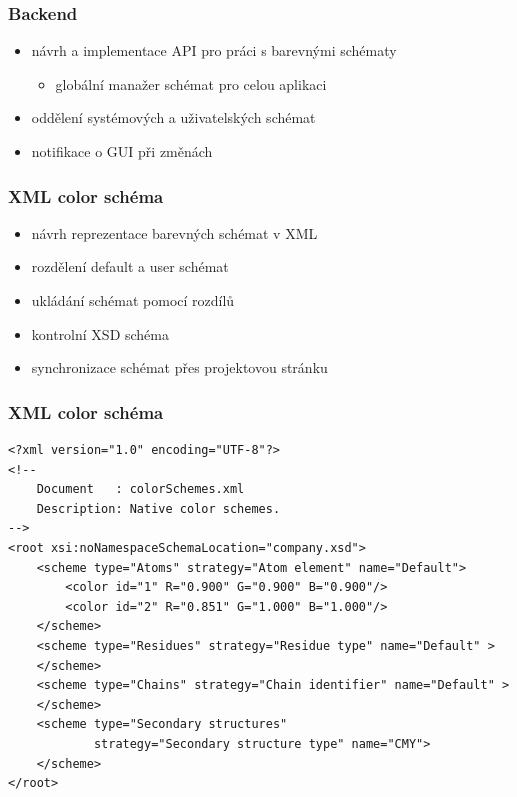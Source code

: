 \documentclass[slovak]{beamer}
\begin{document}
\begin{frame}
\frametitle{Backend}
	\begin{itemize}
		\item návrh a implementace API pro práci s barevnými schématy
		\begin{itemize}
			\item globální manažer schémat pro celou aplikaci
		\end{itemize}
		\item oddělení systémových a uživatelských schémat
		\item notifikace o GUI při změnách
	\end{itemize}
\end{frame}

\begin{frame}
\frametitle{XML color schéma}
	\begin{itemize}
		\item návrh reprezentace barevných schémat v XML
		\item rozdělení default a user schémat
		\item ukládání schémat pomocí rozdílů
		\item kontrolní XSD schéma
		\item synchronizace schémat přes projektovou stránku
	\end{itemize}
\end{frame}

\begin{frame}[fragile]
\frametitle{XML color schéma}
	\lstset{language=XML}
	\scriptsize{
	\begin{lstlisting}
<?xml version="1.0" encoding="UTF-8"?>
<!--
    Document   : colorSchemes.xml
    Description: Native color schemes.
-->
<root xsi:noNamespaceSchemaLocation="company.xsd">
    <scheme type="Atoms" strategy="Atom element" name="Default">
        <color id="1" R="0.900" G="0.900" B="0.900"/>
        <color id="2" R="0.851" G="1.000" B="1.000"/>
    </scheme>
    <scheme type="Residues" strategy="Residue type" name="Default" >  
    </scheme>
    <scheme type="Chains" strategy="Chain identifier" name="Default" >
    </scheme>
    <scheme type="Secondary structures" 
	        strategy="Secondary structure type" name="CMY">
    </scheme>
</root>
	\end{lstlisting}}
\end{frame}
\end{document}
